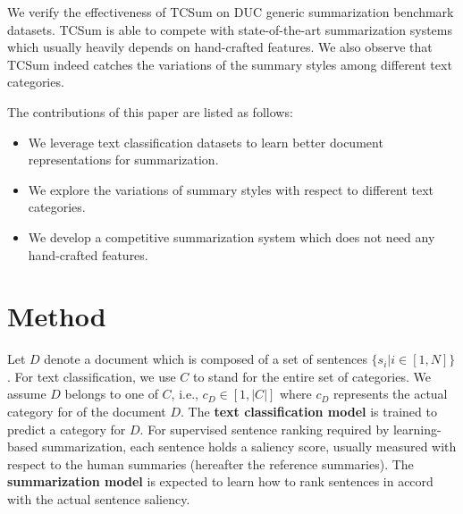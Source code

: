 \documentclass[letterpaper]{article}
\begin{document}

We verify the effectiveness of TCSum on DUC generic summarization benchmark datasets.
TCSum is able to compete with state-of-the-art summarization systems which usually heavily depends on hand-crafted features.
We also observe that TCSum indeed catches the variations of the summary styles among different text categories.  

The contributions of this paper are listed as follows:
\begin{itemize}
	\item We leverage text classification datasets to learn better document representations for summarization.
	\item We explore the variations of summary styles with respect to different text categories.
	\item We develop a competitive summarization system which does not need any hand-crafted features. 
\end{itemize}

\section{Method}

Let $D$ denote a document which is composed of a set of sentences $\{ {s_i}|i \in [1,N]\} $.
For text classification, we use $C$ to stand for the entire set of categories.
We assume $D$ belongs to one of $C$, i.e., $c_D \in [1,|C|]$ where $c_D$ represents the actual category for of the document $D$.
The \textbf{text classification model} is trained to predict a category for $D$.
For supervised sentence ranking required by learning-based summarization, each sentence holds a saliency score, usually measured with respect to the human summaries (hereafter the reference summaries).
The \textbf{summarization model} is expected to learn how to rank sentences in accord with the actual sentence saliency.  
\end{document}

